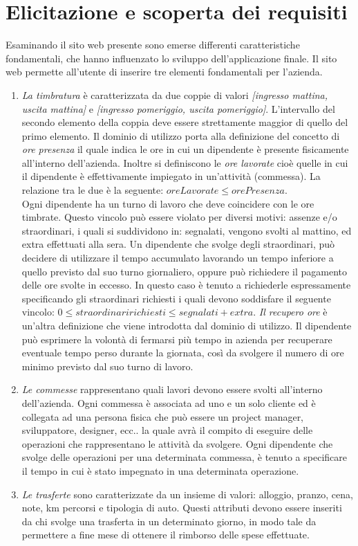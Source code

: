 \documentclass[12pt]{report}
\begin{document}
\section{Elicitazione e scoperta dei requisiti}
Esaminando il sito web presente sono emerse differenti caratteristiche fondamentali, che hanno influenzato lo sviluppo dell'applicazione finale. Il sito web permette all'utente di inserire tre elementi fondamentali per l'azienda.
\begin{enumerate}
	\item \textit{La timbratura} è caratterizzata da due coppie di valori \textit{[ingresso mattina, uscita mattina]} e \textit{[ingresso pomeriggio, uscita pomeriggio]}. L’intervallo del secondo elemento della coppia deve essere strettamente maggior di quello del primo elemento. Il dominio di utilizzo porta alla definizione del concetto di \textit{ore presenza} il quale indica le ore in cui un dipendente è presente fisicamente all’interno dell’azienda. Inoltre si definiscono le \textit{ore lavorate} cioè quelle in cui il dipendente è effettivamente impiegato in un’attività (commessa). La relazione tra le due è la seguente: $oreLavorate \leq orePresenza$.\\
	Ogni dipendente ha un turno di lavoro che deve coincidere con le ore timbrate. Questo vincolo può essere violato per diversi motivi: assenze e/o straordinari, i quali si suddividono in: segnalati, vengono svolti al mattino, ed extra effettuati alla sera. Un dipendente che svolge degli straordinari, può decidere di utilizzare il tempo accumulato lavorando un tempo inferiore a quello previsto dal suo turno giornaliero, oppure può richiedere il pagamento delle ore svolte in eccesso. In questo caso è tenuto a richiederle espressamente specificando gli straordinari richiesti i quali devono soddisfare il seguente vincolo: $0\leq  straordinaririchiesti \leq segnalati+extra$.
	\textit{Il recupero ore} è un'altra definizione che viene introdotta dal dominio di utilizzo. Il dipendente può esprimere la volontà di fermarsi più tempo in azienda per recuperare eventuale tempo perso durante la giornata, così da svolgere il numero di ore minimo previsto dal suo turno di lavoro.
	\item \textit{Le commesse} rappresentano quali lavori devono essere svolti all'interno dell'azienda. Ogni commessa è associata ad uno e un solo cliente ed è collegata ad una persona fisica che può essere un project manager, sviluppatore, designer, ecc.. la quale avrà il compito di eseguire delle operazioni che rappresentano le attività da svolgere. Ogni dipendente che svolge delle operazioni per una determinata commessa, è tenuto a specificare il tempo in cui è stato impegnato in una determinata operazione.
	\item \textit{Le trasferte} sono caratterizzate da un insieme di valori: alloggio, pranzo, cena, note, km percorsi e tipologia di auto. Questi attributi devono essere inseriti da chi svolge una trasferta in un determinato giorno, in modo tale da permettere a fine mese di ottenere il rimborso delle spese effettuate.
\end{enumerate}
\end{document}
